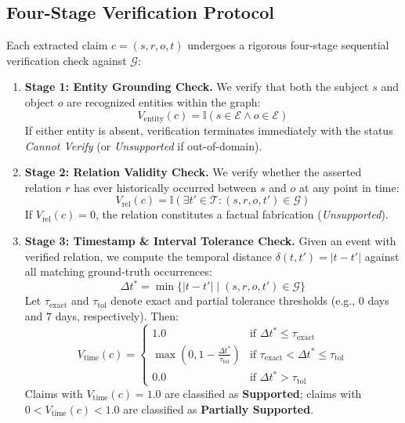 \documentclass[conference]{IEEEtran}
\begin{document}
\subsection{Four-Stage Verification Protocol}
Each extracted claim $c = (s, r, o, t)$ undergoes a rigorous four-stage sequential verification check against $\mathcal{G}$:
\begin{enumerate}
    \item \textbf{Stage 1: Entity Grounding Check.}
    We verify that both the subject $s$ and object $o$ are recognized entities within the graph:
    \begin{equation}
    V_{\mathrm{entity}}(c) = \mathbb{I}(s \in \mathcal{E} \land o \in \mathcal{E})
    \end{equation}
    If either entity is absent, verification terminates immediately with the status \textit{Cannot Verify} (or \textit{Unsupported} if out-of-domain).
    
    \item \textbf{Stage 2: Relation Validity Check.}
    We verify whether the asserted relation $r$ has ever historically occurred between $s$ and $o$ at any point in time:
    \begin{equation}
    V_{\mathrm{rel}}(c) = \mathbb{I}\left(\exists t' \in \mathcal{T} : (s, r, o, t') \in \mathcal{G}\right)
    \end{equation}
    If $V_{\mathrm{rel}}(c) = 0$, the relation constitutes a factual fabrication (\textit{Unsupported}).
    
    \item \textbf{Stage 3: Timestamp & Interval Tolerance Check.}
    Given an event with verified relation, we compute the temporal distance $\delta(t, t') = |t - t'|$ against all matching ground-truth occurrences:
    \begin{equation}
    \Delta t^* = \min \{|t - t'| \mid (s, r, o, t') \in \mathcal{G}\}
    \end{equation}
    Let $\tau_{\mathrm{exact}}$ and $\tau_{\mathrm{tol}}$ denote exact and partial tolerance thresholds (e.g., 0 days and 7 days, respectively). Then:
    \begin{equation}
    V_{\mathrm{time}}(c) = 
    \begin{cases}
    1.0 & \text{if } \Delta t^* \le \tau_{\mathrm{exact}} \\
    \max\left(0, 1 - \frac{\Delta t^*}{\tau_{\mathrm{tol}}}\right) & \text{if } \tau_{\mathrm{exact}} < \Delta t^* \le \tau_{\mathrm{tol}} \\
    0.0 & \text{if } \Delta t^* > \tau_{\mathrm{tol}}
    \end{cases}
    \end{equation}
    Claims with $V_{\mathrm{time}}(c) = 1.0$ are classified as \textbf{Supported}; claims with $0 < V_{\mathrm{time}}(c) < 1.0$ are classified as \textbf{Partially Supported}.
    

\end{enumerate}
\end{document}
